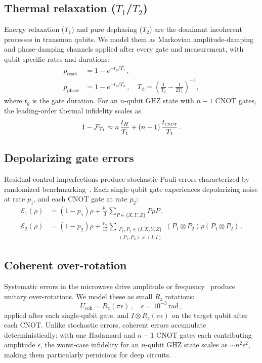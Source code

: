 \documentclass[aip, amsmath, amssymb, preprint, longbibliography]{revtex4-2}
\newcommand{\cnot}{\textsc{cnot}}
\newcommand{\fid}{\mathcal{F}}
\begin{document}
\subsection{Thermal relaxation ($T_1$/$T_2$)}\label{sec:thermal}

Energy relaxation ($T_1$) and pure dephasing ($T_2$) are the dominant
incoherent processes in transmon qubits. We model them as Markovian
amplitude-damping and phase-damping channels applied after every gate and
measurement, with qubit-specific rates and durations:
\begin{align}
p_{\text{reset}} &= 1-e^{-t_g/T_1}\,,\label{eq:t1}\\
p_{\text{phase}} &= 1-e^{-t_g/T_\phi}\,,\quad
T_\phi = \left(\frac{1}{T_2}-\frac{1}{2T_1}\right)^{-1}\!,
\label{eq:t2}
\end{align}
where $t_g$ is the gate duration. For an $n$-qubit GHZ state with
$n-1$ CNOT gates, the leading-order thermal infidelity
scales as
\begin{equation}
1-\fid_{T_1} \approx
n\,\frac{t_H}{T_1}+(n-1)\,\frac{t_{\cnot}}{T_1}\,.
\label{eq:thermal_infidelity}
\end{equation}

\subsection{Depolarizing gate errors}\label{sec:depol}

Residual control imperfections produce stochastic Pauli errors
characterized by randomized benchmarking~\cite{Magesan2012}. Each
single-qubit gate experiences depolarizing noise at rate $p_1$, and each
CNOT gate at rate $p_2$:
\begin{align}
\mathcal{E}_1(\rho) &= (1-p_1)\rho + \frac{p_1}{3}\sum_{P\in\{X,Y,Z\}}
P\rho P\,,\\
\mathcal{E}_2(\rho) &= (1-p_2)\rho + \frac{p_2}{15}
\sum_{\substack{P_1,P_2\in\{I,X,Y,Z\}\\(P_1,P_2)\neq(I,I)}}
(P_1\!\otimes\!P_2)\rho(P_1\!\otimes\!P_2)\,.
\end{align}

\subsection{Coherent over-rotation}\label{sec:coherent}

Systematic errors in the microwave drive amplitude or
frequency~\cite{McKay2017} produce unitary over-rotations. We model
these as small $R_z$ rotations:
\begin{equation}
U_{\text{coh}} = R_z(\pi\epsilon)\,,\quad \epsilon=10^{-3}\,\text{rad}\,,
\label{eq:coherent}
\end{equation}
applied after each single-qubit gate, and $I\otimes R_z(\pi\epsilon)$
on the target qubit after each CNOT. Unlike stochastic errors, coherent
errors accumulate deterministically: with one Hadamard and $n-1$ CNOT
gates each contributing amplitude $\epsilon$, the worst-case
infidelity for an $n$-qubit GHZ state scales as
$\sim n^2\epsilon^2$, making them particularly pernicious for deep
circuits.
\end{document}
